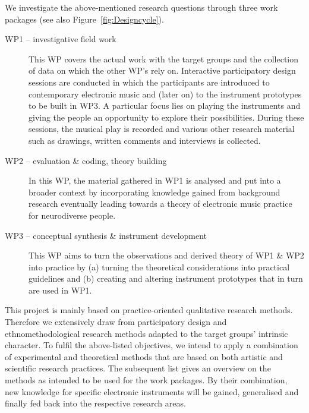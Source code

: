 \documentclass{chi-ext}
\begin{document}
\begin{multicols}{2}

We investigate the above-mentioned research questions through three work packages (see also  Figure~\ref{fig:Designcycle}).
\begin{description}
	\item[WP1 -- investigative field work] 
	 This WP covers the actual work with the target groups and the collection of data on which the other WP’s rely on. 
	Interactive participatory design sessions are conducted in which the participants are introduced to contemporary electronic music and (later on) to the instrument prototypes to be built in WP3. 
	A particular focus lies on playing the instruments and giving the people an opportunity to explore their possibilities. 
	During these sessions, the musical play is recorded and various other research material such as drawings, written comments and interviews is collected.
	\item[WP2 -- evaluation \& coding, theory building] 
	In this WP, the material gathered in WP1 is analysed and put into a broader context by incorporating knowledge gained from background research eventually leading towards a theory of electronic music practice for neurodiverse people.
	\item[WP3 -- conceptual synthesis \& instrument development]  
	This WP aims to turn the observations and derived theory of WP1 \& WP2 into practice by (a) turning the theoretical considerations into practical guidelines and (b) creating and altering instrument prototypes that in turn are used in WP1.
\end{description}

This project is mainly based on practice-oriented qualitative research methods. 
Therefore we extensively draw from participatory design and ethnomethodological research methods adapted to the target groups’ intrinsic character. 
To fulfil the above-listed objectives, we intend to apply a combination of experimental and theoretical methods that are based on both artistic and scientific research practices. The subsequent list gives an overview on the methods as intended to be used for the work packages. By their combination, new knowledge for specific electronic instruments will be gained, generalised and finally fed back into the respective research areas.


\end{multicols}
\end{document}
